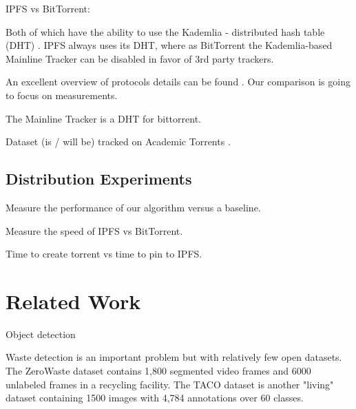 \documentclass[10pt,twocolumn,letterpaper]{article}
\begin{document}
IPFS vs BitTorrent:

Both of which have the ability to use the Kademlia - distributed hash table (DHT) \cite{maymounkov_kademlia_2002}.
IPFS always uses its DHT, where as BitTorrent the Kademlia-based Mainline
Tracker can be disabled in favor of 3rd party trackers.

An excellent overview of protocols details can be found \cite{zebedee_comparing_2023}.
Our comparison is going to focus on measurements.



The Mainline Tracker is a DHT for bittorrent.



Dataset (is / will be) tracked on Academic Torrents \cite{academic_torrents_Cohen2014}.


\subsection{Distribution Experiments}

Measure the performance of our algorithm versus a baseline.

Measure the speed of IPFS vs BitTorrent.

Time to create torrent vs time to pin to IPFS.

\section{Related Work}

Object detection

Waste detection is an important problem but with relatively few open datasets.
The ZeroWaste dataset \cite{bashkirova_zerowaste_2022} contains 1,800 segmented
video frames and 6000 unlabeled frames in a recycling facility.
The TACO dataset \cite{proenca_taco_2020} is another "living" dataset
containing 1500 images with 4,784 annotations over 60 classes.
\end{document}
